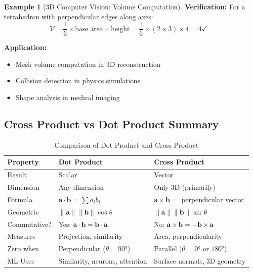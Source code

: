 \documentclass[12pt,a4paper]{article}
\theoremstyle{definition}
\newtheorem{example}{Example}[section]
\begin{document}
\begin{example}[3D Computer Vision: Volume Computation]
\textbf{Verification:} 
For a tetrahedron with perpendicular edges along axes:
\begin{equation}
V = \frac{1}{6} \times \text{base area} \times \text{height} = \frac{1}{6} \times (2 \times 3) \times 4 = 4 \checkmark
\end{equation}

\textbf{Application:}
\begin{itemize}
    \item Mesh volume computation in 3D reconstruction
    \item Collision detection in physics simulations
    \item Shape analysis in medical imaging
\end{itemize}
\end{example}

\subsection{Cross Product vs Dot Product Summary}

\begin{table}[h]
\centering
\begin{tabular}{|p{3cm}|p{5cm}|p{5cm}|}
\hline
\textbf{Property} & \textbf{Dot Product} & \textbf{Cross Product} \\
\hline
Result & Scalar & Vector \\
\hline
Dimension & Any dimension & Only 3D (primarily) \\
\hline
Formula & $\mathbf{a} \cdot \mathbf{b} = \sum a_i b_i$ & $\mathbf{a} \times \mathbf{b} = $ perpendicular vector \\
\hline
Geometric & $\|\mathbf{a}\|\|\mathbf{b}\|\cos\theta$ & $\|\mathbf{a}\|\|\mathbf{b}\|\sin\theta$ \\
\hline
Commutative? & Yes: $\mathbf{a} \cdot \mathbf{b} = \mathbf{b} \cdot \mathbf{a}$ & No: $\mathbf{a} \times \mathbf{b} = -\mathbf{b} \times \mathbf{a}$ \\
\hline
Measures & Projection, similarity & Area, perpendicularity \\
\hline
Zero when & Perpendicular ($\theta = 90°$) & Parallel ($\theta = 0°$ or $180°$) \\
\hline
ML Uses & Similarity, neurons, attention & Surface normals, 3D geometry \\
\hline
\end{tabular}
\caption{Comparison of Dot Product and Cross Product}
\end{table}
\end{document}
